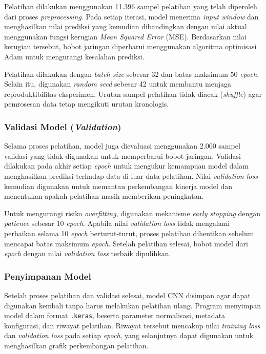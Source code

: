 \documentclass[10pt,conference]{IEEEtran}
\begin{document}
Pelatihan dilakukan menggunakan 11.396 sampel pelatihan yang telah diperoleh dari proses \textit{preprocessing}. Pada setiap iterasi, model menerima \textit{input window} dan menghasilkan nilai prediksi yang kemudian dibandingkan dengan nilai aktual menggunakan fungsi kerugian \textit{Mean Squared Error} (MSE). Berdasarkan nilai kerugian tersebut, bobot jaringan diperbarui menggunakan algoritma optimisasi Adam untuk mengurangi kesalahan prediksi.

Pelatihan dilakukan dengan \textit{batch size} sebesar 32 dan batas maksimum 50 \textit{epoch}. Selain itu, digunakan \textit{random seed} sebesar 42 untuk membantu menjaga reproduktibilitas eksperimen. Urutan sampel pelatihan tidak diacak (\textit{shuffle}) agar pemrosesan data tetap mengikuti urutan kronologis.

\subsubsection{Validasi Model (\textit{Validation})}
\leavevmode\par\nopagebreak

Selama proses pelatihan, model juga dievaluasi menggunakan 2.000 sampel validasi yang tidak digunakan untuk memperbarui bobot jaringan. Validasi dilakukan pada akhir setiap \textit{epoch} untuk mengukur kemampuan model dalam menghasilkan prediksi terhadap data di luar data pelatihan. Nilai \textit{validation loss} kemudian digunakan untuk memantau perkembangan kinerja model dan menentukan apakah pelatihan masih memberikan peningkatan.

Untuk mengurangi risiko \textit{overfitting}, digunakan mekanisme \textit{early stopping} dengan \textit{patience} sebesar 10 \textit{epoch}. Apabila nilai \textit{validation loss} tidak mengalami perbaikan selama 10 \textit{epoch} berturut-turut, proses pelatihan dihentikan sebelum mencapai batas maksimum \textit{epoch}. Setelah pelatihan selesai, bobot model dari \textit{epoch} dengan nilai \textit{validation loss} terbaik dipulihkan.

\subsubsection{Penyimpanan Model}
\leavevmode\par\nopagebreak

Setelah proses pelatihan dan validasi selesai, model CNN disimpan agar dapat digunakan kembali tanpa harus melakukan pelatihan ulang. Program menyimpan model dalam format \texttt{.keras}, beserta parameter normalisasi, metadata konfigurasi, dan riwayat pelatihan. Riwayat tersebut mencakup nilai \textit{training loss} dan \textit{validation loss} pada setiap \textit{epoch}, yang selanjutnya dapat digunakan untuk menghasilkan grafik perkembangan pelatihan. 
\end{document}
